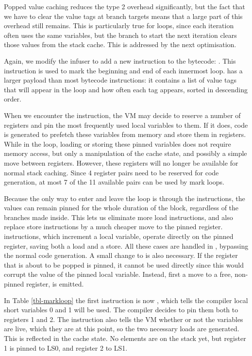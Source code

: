 Popped value caching reduces the type 2 overhead significantly, but the fact that we have to clear the value tags at branch targets means that a large part of this overhead still remains. This is particularly true for loops, since each iteration often uses the same variables, but the branch to start the next iteration clears those values from the stack cache. This is addressed by the next optimisation.

Again, we modify the infuser to add a new instruction to the bytecode: . This instruction is used to mark the beginning and end of each innermost loop.  has a larger payload than most bytecode instructions: it contains a list of value tags that will appear in the loop and how often each tag appears, sorted in descending order.

When we encounter the  instruction, the VM may decide to reserve a number of registers and pin the most frequently used local variables to them. If it does, code is generated to prefetch these variables from memory and store them in registers. While in the loop, loading or storing these pinned variables does not require memory access, but only a manipulation of the cache state, and possibly a simple move between registers. However, these registers will no longer be available for normal stack caching. Since 4 register pairs need to be reserved for code generation, at most 7 of the 11 available pairs can be used by mark loops.

Because the only way to enter and leave the loop is through the  instructions, the values can remain pinned for the whole duration of the block, regardless of the branches made inside. This lets us eliminate more load instructions, and also replace store instructions by a much cheaper move to the pinned register.  instructions, which increment a local variable, operate directly on the pinned register, saving both a load and a store. All these cases are handled in , bypassing the normal code generation. A small change to  is also necessary. If the register that is about to be popped is pinned, it cannot be used directly since this would corrupt the value of the pinned local variable. Instead, first a move to a free, non-pinned register, is emitted.

In Table \ref{tbl-markloop} the first instruction is now , which tells the compiler local short variables 0 and 1 will be used. The compiler decides to pin them both to registers 1 and 2. The  instruction also tells the VM whether or not the variables are live, which they are at this point, so the two necessary loads are generated. This is reflected in the cache state. No elements are on the stack yet, but register 1 is pinned to LS0, and register 2 to LS1.

